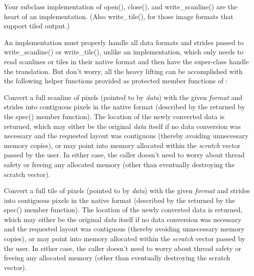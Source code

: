 Your subclass implementation of {\cf open()}, {\cf close()}, and {\cf
  write_scanline()} are the heart of an \ImageOutput implementation.
(Also {\cf write_tile()}, for those image formats that support tiled
output.)

An \ImageOutput implementation must properly handle all data formats and
strides passed to {\cf write_scanline()} or {\cf write_tile()}, unlike
an \ImageInput implementation, which only needs to read scanlines or
tiles in their native format and then have the super-class handle the
translation.  But don't worry, all the heavy lifting can be accomplished
with the following helper functions provided as protected member
functions of \ImageOutput:


Convert a full scanline of pixels (pointed to by \emph{data}) with the
given \emph{format} and strides into contiguous pixels in the native
format (described by the \ImageSpec returned by the {\cf spec()} member
function).  The location of the newly converted data is returned, which
may either be the original \emph{data} itself if no data conversion was
necessary and the requested layout was contiguous (thereby avoiding
unnecessary memory copies), or may point into memory allocated within
the \emph{scratch} vector passed by the user.  In either case, the
caller doesn't need to worry about thread safety or freeing any
allocated memory (other than eventually destroying the scratch vector).
\apiend


Convert a full tile of pixels (pointed to by \emph{data}) with the given
\emph{format} and strides into contiguous pixels in the native format
(described by the \ImageSpec returned by the {\cf spec()} member
function).  The location of the newly converted data is returned, which
may either be the original \emph{data} itself if no data conversion was
necessary and the requested layout was contiguous (thereby avoiding
unnecessary memory copies), or may point into memory allocated within
the \emph{scratch} vector passed by the user.  In either case, the
caller doesn't need to worry about thread safety or freeing any
allocated memory (other than eventually destroying the scratch vector).

